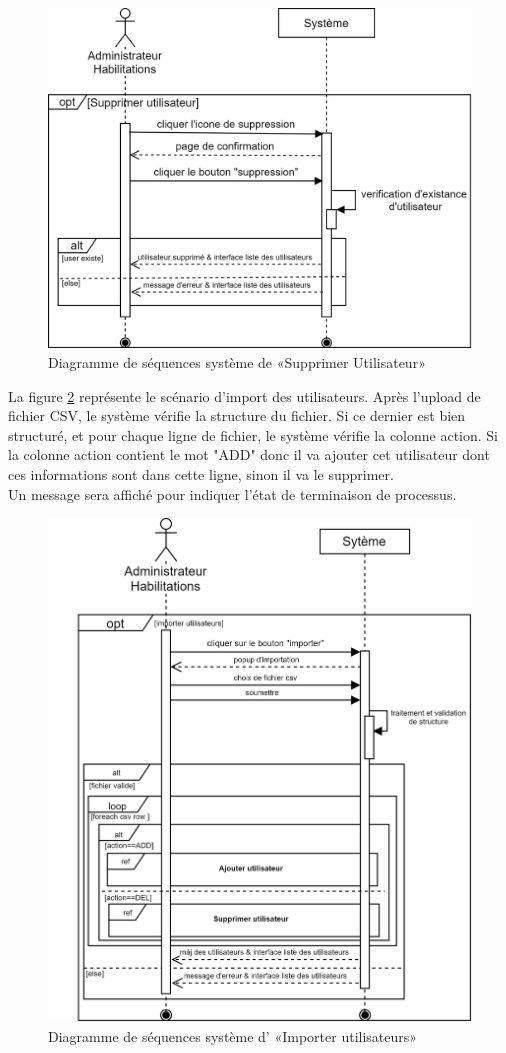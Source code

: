 \begin{figure}[H]
	\centering
	\includegraphics[width=0.65\linewidth]{img/conception/sequences/delete-user}
	\caption[Diagramme de séquences système de «Supprimer Utilisateur»]{Diagramme de séquences système de «Supprimer Utilisateur»}
	\label{fig:delete-user}
\end{figure}
\newpage
{}
La figure \ref{fig:import} représente le scénario d'import des utilisateurs. Après l'upload de fichier CSV, le système vérifie la structure du fichier. Si ce dernier est bien structuré, et pour chaque ligne de fichier, le système vérifie la colonne action. Si la colonne action contient le mot "ADD" donc il va ajouter cet utilisateur dont ces informations sont dans cette ligne, sinon il va le supprimer.\\
Un message sera affiché pour indiquer l'état de terminaison de processus.  
\begin{figure}[H]
	\centering
	\includegraphics[width=0.65\linewidth]{img/conception/sequences/import}
	\caption[Diagramme de séquences système d’ «Importer utilisateurs»]{Diagramme de séquences système d' «Importer utilisateurs»}
	\label{fig:import}
\end{figure}

